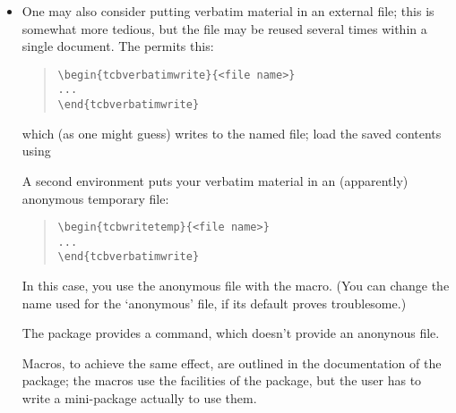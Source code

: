 \begin{itemize}
  A robust alternative is:
\begin{quote}
\begin{verbatim}
\chardef\us=`\_
...
\section{... \texttt{my\us name}}
\end{verbatim}
\end{quote}
  Such a definition is `naturally' robust; the construction
  ``'' may be used for any
  troublesome character (though it's plainly not necessary for things
  like percent signs for which \AllTeX{} already provides
  robust macros).

\item One may also consider putting verbatim material in an external
  file; this is somewhat more tedious, but the file may be reused
  several times within a single document.  The 
  permits this:
\begin{quote}
\begin{verbatim}
\begin{tcbverbatimwrite}{<file name>}
...
\end{tcbverbatimwrite}
\end{verbatim}
\end{quote}
  which (as one might guess) writes to the named file; load the saved
  contents using 

  A second environment puts your verbatim material in an (apparently)
  anonymous temporary file:
\begin{quote}
\begin{verbatim}
\begin{tcbwritetemp}{<file name>}
...
\end{tcbverbatimwrite}
\end{verbatim}
\end{quote}
  In this case, you use the anonymous file with the 
  macro.  (You can change the name used for the `anonymous' file, if
  its default proves troublesome.)

  The  package provides a 
  command, which doesn't provide an anonynous file.

  Macros, to achieve the same effect, are outlined in the
  documentation of the  package; the macros use the
  facilities of the package, but the user has to write a mini-package
  actually to use them.
\end{itemize}
